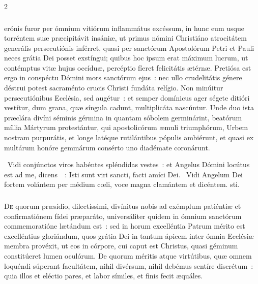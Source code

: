 \documentclass[9pt,twoside]{extarticle}
\begin{document}
\begin{multicols}{2}
{{\subsubsection*{\center {}}
erónis furor per ómnium vitiórum inflammátus excéssum, in hunc eum usque torréntem suæ præcipitávit insániæ, ut primus nómini Christiáno atrocitátem generális persecutiónis inférret, quasi per sanctórum Apostolórum Petri et Pauli neces grátia Dei posset exstíngui; quibus hoc ipsum erat máximum lucrum, ut contémptus vitæ hujus occíduæ, percéptio fíeret felicitátis ætérnæ. Pretiósa est ergo in conspéctu Dómini mors sanctórum ejus~: nec ullo crudelitátis génere déstrui potest sacraménto crucis Christi fundáta relígio. Non minúitur persecutiónibus Ecclésia, sed augétur~: et semper domínicus ager ségete ditióri vestítur, dum grana, quæ síngula cadunt, multiplicáta nascúntur. Unde duo ista præclára divíni séminis gérmina in quantam sóbolem germinárint, beatórum míllia Mártyrum protestántur, qui apostolicórum æmuli triumphórum, Urbem nostram purpurátis, et longe latéque rutilántibus pópulis ambiérunt, et quasi ex multárum honóre gemmárum consérto uno diadémate coronárunt.

\begin{tightlist}{}
\item {}~Vidi conjúnctos viros habéntes spléndidas vestes~: et Angelus Dómini locútus est ad me, dicens~~: \textred{*} Isti sunt viri sancti, facti amíci Dei. ~Vidi Angelum Dei fortem volántem per médium cœli, voce magna clamántem et dicéntem. sti.
\end{tightlist}

\subsubsection*{\center {}}
\lettrine{D}e quorum præsídio, dilectíssimi, divínitus nobis ad exémplum patiéntiæ et confirmatiónem fídei præparáto, universáliter quidem in ómnium sanctórum commemoratióne lætándum est~: sed in horum excelléntia Patrum mérito est excelléntius gloriándum, quos grátia Dei in tantum ápicem inter ómnia Ecclésiæ membra provéxit, ut eos in córpore, cui caput est Christus, quasi géminum constitúeret lumen oculórum. De quorum méritis atque virtútibus, quæ omnem loquéndi súperant facultátem, nihil divérsum, nihil debémus sentíre discrétum~: quia illos et eléctio pares, et labor símiles, et finis fecit æquáles.

}}
\end{multicols}
\end{document}
